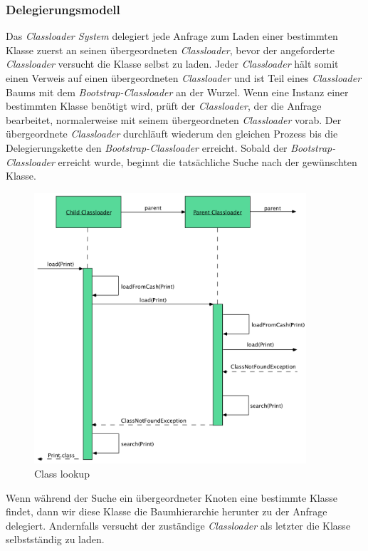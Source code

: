\subsubsection{Delegierungsmodell}
Das \textit{Classloader System} delegiert jede Anfrage zum Laden einer bestimmten Klasse zuerst an seinen übergeordneten \textit{Classloader}, bevor der angeforderte \textit{Classloader} versucht die Klasse selbst zu laden. 
Jeder \textit{Classloader} hält somit einen Verweis auf einen übergeordneten \textit{Classloader} und ist Teil eines \textit{Classloader} Baums mit dem \textit{Bootstrap-Classloader} an der Wurzel. Wenn eine Instanz einer bestimmten Klasse benötigt wird, prüft der \textit{Classloader}, der die Anfrage bearbeitet, normalerweise mit seinem übergeordneten \textit{Classloader} vorab. Der übergeordnete \textit{Classloader} durchläuft wiederum den gleichen Prozess bis die Delegierungskette den \textit{Bootstrap-Classloader} erreicht. Sobald der \textit{Bootstrap-Classloader} erreicht wurde, beginnt die tatsächliche Suche nach der gewünschten Klasse.
\begin{figure}[h]
  \centering
  \includegraphics[width=0.9\textwidth]{material/images/flow_diagram.png}
  \caption{Class lookup}
  \label{fig:flow_diagram}
\end{figure}
Wenn während der Suche ein übergeordneter Knoten eine bestimmte Klasse findet, dann wir diese Klasse die Baumhierarchie herunter zu der Anfrage delegiert. Andernfalls versucht der zuständige \textit{Classloader} als letzter die Klasse selbstständig zu laden.
